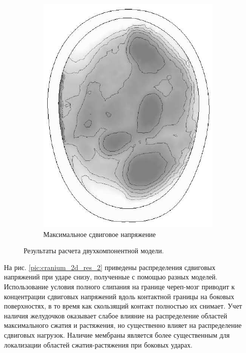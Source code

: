 \begin{figure}[h]
\begin{subfigure}[b]{0.3\textwidth}
\includegraphics[width=\textwidth]{png/cranium/2d-problem-res-3.png}
\caption{Максимальное сдвиговое напряжение}
\end{subfigure}
\caption{Результаты расчета двухкомпонентной модели.}
\label{pic:cranium_2d_res_1}
\end{figure}

На рис. \ref{pic:cranium_2d_res_2} приведены распределения сдвиговых напряжений при ударе снизу, полученные с помощью разных моделей. Использование условия полного слипания на границе череп-мозг приводит к концентрации сдвиговых напряжений вдоль контактной границы на боковых поверхностях, в то время как скользящий контакт полностью их снимает. Учет наличия желудочков оказывает слабое влияние на распределение областей максимального сжатия и растяжения, но существенно влияет на распределение сдвиговых нагрузок. Наличие мембраны является более существенным для локализации областей сжатия-растяжения при боковых ударах.

